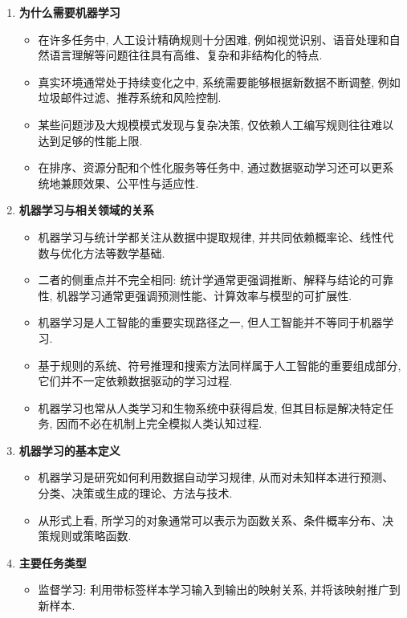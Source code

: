 \documentclass{../nndlcourse}
\begin{document}
\begin{enumerate}
  \item \textbf{为什么需要机器学习}
    \begin{itemize}
      \item 在许多任务中, 人工设计精确规则十分困难, 例如视觉识别、语音处理和自然语言理解等问题往往具有高维、复杂和非结构化的特点.
      \item 真实环境通常处于持续变化之中, 系统需要能够根据新数据不断调整, 例如垃圾邮件过滤、推荐系统和风险控制.
      \item 某些问题涉及大规模模式发现与复杂决策, 仅依赖人工编写规则往往难以达到足够的性能上限.
      \item 在排序、资源分配和个性化服务等任务中, 通过数据驱动学习还可以更系统地兼顾效果、公平性与适应性.
    \end{itemize}
  \item \textbf{机器学习与相关领域的关系}
    \begin{itemize}
      \item 机器学习与统计学都关注从数据中提取规律, 并共同依赖概率论、线性代数与优化方法等数学基础.
      \item 二者的侧重点并不完全相同: 统计学通常更强调推断、解释与结论的可靠性, 机器学习通常更强调预测性能、计算效率与模型的可扩展性.
      \item 机器学习是人工智能的重要实现路径之一, 但人工智能并不等同于机器学习.
      \item 基于规则的系统、符号推理和搜索方法同样属于人工智能的重要组成部分, 它们并不一定依赖数据驱动的学习过程.
      \item 机器学习也常从人类学习和生物系统中获得启发, 但其目标是解决特定任务, 因而不必在机制上完全模拟人类认知过程.
    \end{itemize}
  \item \textbf{机器学习的基本定义}
    \begin{itemize}
      \item 机器学习是研究如何利用数据自动学习规律, 从而对未知样本进行预测、分类、决策或生成的理论、方法与技术.
      \item 从形式上看, 所学习的对象通常可以表示为函数关系、条件概率分布、决策规则或策略函数.
    \end{itemize}
  \item \textbf{主要任务类型}
    \begin{itemize}
      \item 监督学习: 利用带标签样本学习输入到输出的映射关系, 并将该映射推广到新样本.
        \begin{itemize}

\end{itemize}
\end{itemize}
\end{enumerate}
\end{document}
